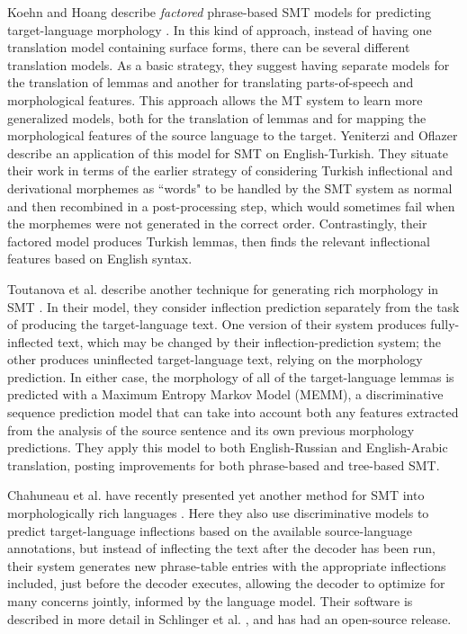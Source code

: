 Koehn and Hoang describe \emph{factored} phrase-based SMT models for predicting
target-language morphology \cite{koehn-hoang:2007:EMNLP-CoNLL2007}. In this
kind of approach, instead of having one translation model containing surface
forms, there can be several different translation models. As a basic strategy,
they suggest having separate models for the translation of lemmas and another
for translating parts-of-speech and morphological features. This approach
allows the MT system to learn more generalized models, both for the translation
of lemmas and for mapping the morphological features of the source language to
the target.
Yeniterzi and Oflazer \cite{yeniterzi-oflazer:2010:ACL} describe an
application of this model for SMT on English-Turkish.
They situate their work in terms of the earlier strategy of considering Turkish
inflectional and derivational morphemes as ``words" to be handled by the SMT
system as normal and then recombined in a post-processing step, which would
sometimes fail when the morphemes were not generated in the correct order.
Contrastingly, their factored model produces Turkish lemmas, then finds the
relevant inflectional features based on English syntax.

Toutanova et al. describe another technique for generating rich morphology in
SMT \cite{toutanova-suzuki-ruopp:2008:ACLMain}. In their model, they consider
inflection prediction separately from the task of producing the target-language
text. One version of their system produces fully-inflected text, which may be
changed by their inflection-prediction system; the other produces uninflected
target-language text, relying on the morphology prediction. In either case, the
morphology of all of the target-language lemmas is predicted with a Maximum
Entropy Markov Model (MEMM), a discriminative sequence prediction model that
can take into account both any features extracted from the analysis of the
source sentence and its own previous morphology predictions. They apply this
model to both English-Russian and English-Arabic translation, posting
improvements for both phrase-based and tree-based SMT.

Chahuneau et al. have recently presented yet another method for SMT into
morphologically rich languages \cite{chahuneau-EtAl:2013:EMNLP}. Here they
also use discriminative models to predict target-language inflections based on
the available source-language annotations, but instead of inflecting the text
after the decoder has been run, their system generates new phrase-table entries
with the appropriate inflections included, just before the decoder executes,
allowing the decoder to optimize for many concerns jointly, informed by the
language model. Their software is described in more detail in Schlinger et al.
\cite{DBLP:journals/pbml/SchlingerCD13}, and has had an open-source release.
